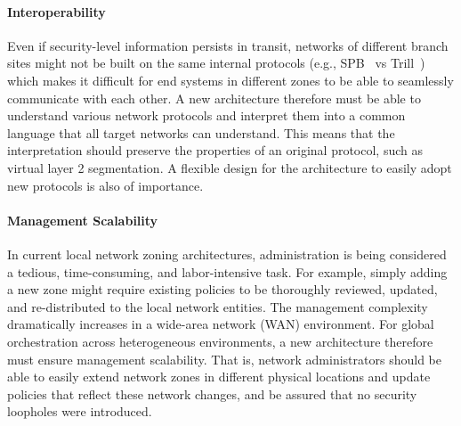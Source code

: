 \paragraph{Interoperability}
Even if security-level information persists in transit, networks of different branch sites might
not be built on the same internal protocols (e.g., SPB~\cite{ieee2012spb} vs
Trill~\cite{rfc6325}) which makes it difficult for end systems in different
zones to be able to seamlessly communicate with each other. A new architecture
therefore must be able to understand various network protocols and interpret
them into a common language that all target networks can understand. This means
that the interpretation should preserve the properties of an original protocol,
such as virtual layer 2 segmentation. A flexible design for the architecture to
easily adopt new protocols is also of importance.

\paragraph{Management Scalability}
In current local network zoning architectures, administration is being
considered a tedious, time-consuming, and labor-intensive task. For example,
simply adding a new zone might require existing policies to be thoroughly
reviewed, updated, and re-distributed to the local network entities. The
management complexity dramatically increases in a wide-area network (WAN)
environment. For global orchestration across heterogeneous environments, a new
architecture therefore must ensure management scalability. That is, network
administrators should be able to easily extend network zones in different
physical locations and update policies that reflect these network changes, and
be assured that no security loopholes were introduced.







